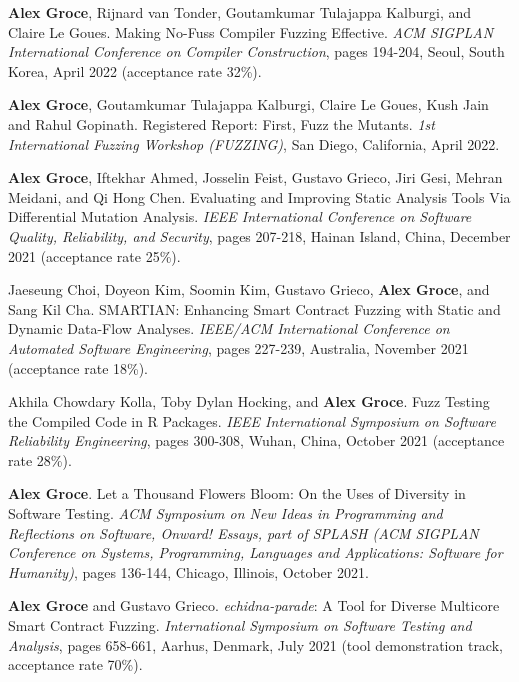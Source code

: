 \documentclass[ComputerScience]{vita}
\begin{document}
\begin{vita}
\begin{Refereed Conference and Workshop Publications}
\item {\bf Alex Groce}, Rijnard van Tonder, Goutamkumar
  Tulajappa Kalburgi, and Claire Le Goues.
  \newblock Making No-Fuss Compiler Fuzzing Effective.
  \newblock \emph{ACM SIGPLAN International Conference
on Compiler Construction}, pages 194-204, Seoul, South
Korea, April 2022 (acceptance rate 32\%).

\item {\bf Alex Groce}, Goutamkumar
  Tulajappa Kalburgi, Claire Le Goues, Kush Jain and Rahul Gopinath.
  \newblock Registered Report: First, Fuzz the Mutants.
  \newblock \emph{1st International Fuzzing Workshop (FUZZING)}, San Diego, California, April 2022.

\item {\bf Alex Groce}, Iftekhar Ahmed, Josselin Feist, Gustavo
  Grieco, Jiri Gesi, Mehran Meidani, and Qi Hong Chen.
  \newblock Evaluating and Improving Static Analysis Tools Via
  Differential Mutation Analysis.
  \newblock \emph{IEEE International Conference on Software
Quality, Reliability, and Security}, pages 207-218, Hainan
Island, China, December 2021 (acceptance rate 25\%).
  
\item Jaeseung Choi, Doyeon Kim, Soomin Kim, Gustavo Grieco, {\bf Alex Groce}, and Sang Kil Cha.
\newblock SMARTIAN: Enhancing Smart Contract Fuzzing with Static and Dynamic Data-Flow Analyses.
\newblock \emph{IEEE/ACM International Conference on Automated Software
  Engineering}, pages 227-239, Australia, November 2021 (acceptance rate 18\%).

\item Akhila Chowdary Kolla, Toby Dylan Hocking, and {\bf Alex Groce}.
\newblock Fuzz Testing the Compiled Code in R Packages.
\newblock \emph{IEEE International Symposium on Software Reliability
  Engineering}, pages 300-308, Wuhan, China, October 2021 (acceptance rate 28\%).

\item
{\bf Alex Groce}.
\newblock Let a Thousand Flowers Bloom: On the Uses of Diversity in Software Testing.
\newblock \emph{ACM Symposium on New Ideas in Programming and
  Reflections on Software, Onward! Essays, part of SPLASH (ACM SIGPLAN
  Conference on Systems, Programming, Languages and Applications:
  Software for Humanity)}, pages 136-144, Chicago, Illinois, October 2021.

\item {\bf Alex Groce} and Gustavo Grieco.
  \newblock \emph{echidna-parade}: A Tool for Diverse Multicore Smart Contract Fuzzing.
  \newblock \emph{International Symposium on Software Testing and
  Analysis}, pages 658-661, Aarhus, Denmark, July
2021 (tool demonstration track, acceptance rate 70\%).
  

\end{Refereed Conference and Workshop Publications}
\end{vita}
\end{document}
